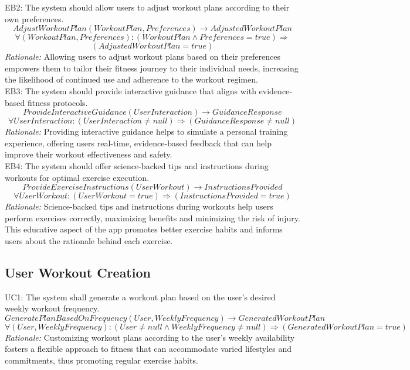 \documentclass[12pt]{article}
\begin{document}
EB2: The system should allow users to adjust workout plans according to their own preferences.
\[AdjustWorkoutPlan(WorkoutPlan, Preferences) \rightarrow AdjustedWorkoutPlan \]
\[ \forall (WorkoutPlan, Preferences): (WorkoutPlan \land Preferences = true) \Rightarrow\] \[(AdjustedWorkoutPlan = true) \]
\textit{Rationale:} Allowing users to adjust workout plans based on their preferences empowers them to tailor their fitness journey to their individual needs, increasing the likelihood of continued use and adherence to the workout regimen.
\\

EB3: The system should provide interactive guidance that aligns with evidence-based fitness protocols.
\[ProvideInteractiveGuidance(UserInteraction) \rightarrow GuidanceResponse \]
\[ \forall UserInteraction: (UserInteraction \neq null) \Rightarrow (GuidanceResponse \neq null) \]
\textit{Rationale:} Providing interactive guidance helps to simulate a personal training experience, offering users real-time, evidence-based feedback that can help improve their workout effectiveness and safety.
\\

EB4: The system should offer science-backed tips and instructions during workouts for optimal exercise execution.
\[ProvideExerciseInstructions(UserWorkout) \rightarrow InstructionsProvided \]
\[ \forall UserWorkout: (UserWorkout = true) \Rightarrow (InstructionsProvided = true) \]
\textit{Rationale:} Science-backed tips and instructions during workouts help users perform exercises correctly, maximizing benefits and minimizing the risk of injury. This educative aspect of the app promotes better exercise habits and informs users about the rationale behind each exercise.

\subsection{User Workout Creation}
UC1: The system shall generate a workout plan based on the user's desired weekly workout frequency.
\[GeneratePlanBasedOnFrequency(User, WeeklyFrequency) \rightarrow GeneratedWorkoutPlan \]
\[ \forall (User, WeeklyFrequency): (User \neq null \land WeeklyFrequency \neq null) \Rightarrow (GeneratedWorkoutPlan = true) \]
\textit{Rationale:} Customizing workout plans according to the user's weekly availability fosters a flexible approach to fitness that can accommodate varied lifestyles and commitments, thus promoting regular exercise habits.
\\
\end{document}

